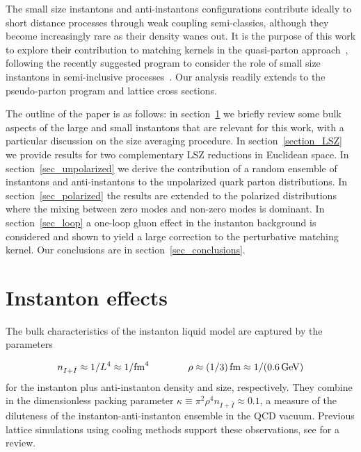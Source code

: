\documentclass[11pt,aps,amsmath,amssymb,nofootinbib,notitlepage,longbibliography]{revtex4-1}
\begin{document}
The small size instantons and anti-instantons configurations contribute ideally to short distance processes through weak coupling
semi-classics, although they become increasingly rare as their density wanes out.  It is the purpose of this work to explore their
contribution to matching kernels in the quasi-parton approach~\cite{Ji:2020ect}, following  the
recently suggested program to consider the role of small size instantons in semi-inclusive processes~\cite{Shuryak:2020ktq}.
Our analysis readily extends to the pseudo-parton program and lattice cross sections.

The outline of the paper is as follows: in section~\ref{sec_instantons} we briefly review some bulk aspects of the large and small
instantons that are relevant for this work, with a particular discussion on the size averaging procedure. In section~\ref{section_LSZ}
we provide results for two complementary LSZ reductions in Euclidean space. In section~\ref{sec_unpolarized} we derive the
contribution of  a random ensemble of instantons and anti-instantons to the unpolarized quark parton distributions.
In section~\ref{sec_polarized} the results are extended to the polarized distributions where the mixing between zero
modes and non-zero modes is dominant. In section~\ref{sec_loop} a one-loop gluon effect in the instanton background
is considered and shown to yield a large correction to the perturbative matching kernel.  Our
conclusions are in section~\ref{sec_conclusions}.


\section{Instanton effects}
\label{sec_instantons}

The bulk characteristics of the instanton liquid model are captured by the parameters~\cite{Shuryak:1981ff}


\begin{equation}
n_{I+\bar I}\approx 1/L^4\approx 1/{\rm fm}^{4} \qquad\qquad \rho\approx (1/3) \, {\rm fm} \approx  1/(0.6\, {\rm GeV})  \label{eqn_ILM}
\end{equation}
for the instanton plus anti-instanton density and size, respectively. They combine in the  dimensionless packing parameter
$\kappa\equiv \pi^2\rho^4 n_{I+\bar I}\approx 0.1$,
a measure of  the diluteness of the instanton-anti-instanton ensemble in the QCD vacuum. Previous
lattice simulations using cooling methods support these observations, see \cite{Schafer:1996wv} for a review.
\end{document}
